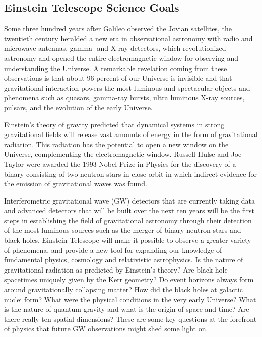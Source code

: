 \setlength{\fboxrule}{3pt} 
\setlength{\fboxsep}{5pt} 
\FloatBarrier
\subsection{Einstein Telescope Science Goals}

Some three hundred years after Galileo observed the Jovian 
satellites, the twentieth century heralded a new era in 
observational astronomy with  radio and microwave antennas, 
gamma- and X-ray detectors, which revolutionized astronomy and 
opened the entire electromagnetic window for observing 
and understanding the Universe. A remarkable revelation 
coming from these observations is that about 96 percent of 
our Universe is invisible and that gravitational interaction 
powers the most luminous and spectacular objects and phenomena 
such as quasars, gamma-ray bursts, ultra luminous X-ray sources, 
pulsars, and the evolution of the early Universe.

Einstein's theory of gravity predicted that dynamical systems 
in strong gravitational fields will release vast amounts of 
energy in the form of gravitational radiation. This radiation 
has the potential to open a new window on the Universe, 
complementing the electromagnetic window. Russell Hulse 
and Joe Taylor were awarded the 1993 Nobel Prize in Physics for 
the discovery of a binary consisting of two neutron stars in 
close orbit in which indirect evidence for the emission of
gravitational waves was found. 

Interferometric gravitational wave (GW) detectors that are currently 
taking data and advanced detectors that will be built over 
the next ten years will be the first steps in establishing 
the field of gravitational astronomy through their detection 
of the most luminous sources such as the merger 
of binary neutron stars and black holes.  Einstein Telescope will 
make it possible to observe a greater variety of phenomena, and 
provide a new tool for expanding our knowledge of fundamental 
physics, cosmology and relativistic astrophysics. Is the 
nature of gravitational radiation as predicted by Einstein's 
theory? Are black hole spacetimes uniquely given by the Kerr geometry?
Do event horizons always form around gravitationally collapsing matter?
How did the black holes at galactic nuclei form? What were the 
physical conditions in the very early Universe? What is the 
nature of quantum gravity and what is the origin of space and 
time? Are there really ten spatial dimensions? These are 
some key questions at the forefront of physics that future GW 
observations might shed some light on.
\FloatBarrier
